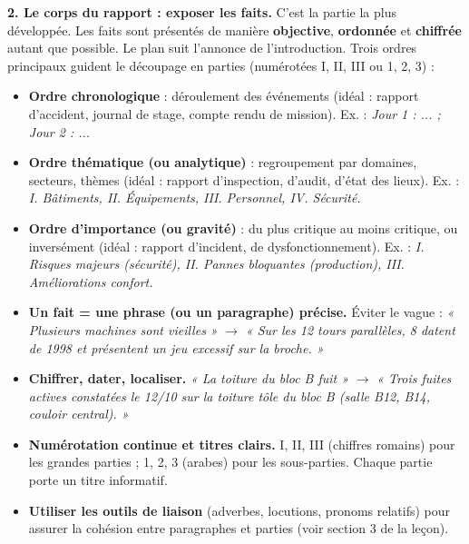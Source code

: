 \documentclass[11pt]{article}
\begin{document}
\textbf{2. Le corps du rapport : exposer les faits.} C'est la partie la plus développée. Les faits sont présentés de manière \textbf{objective}, \textbf{ordonnée} et \textbf{chiffrée} autant que possible. Le plan suit l'annonce de l'introduction. Trois ordres principaux guident le découpage en parties (numérotées I, II, III ou 1, 2, 3) :
\begin{itemize}
\item \textbf{Ordre chronologique} : déroulement des événements (idéal : rapport d'accident, journal de stage, compte rendu de mission). Ex. : \emph{Jour 1 : ... ; Jour 2 : ...}
\item \textbf{Ordre thématique (ou analytique)} : regroupement par domaines, secteurs, thèmes (idéal : rapport d'inspection, d'audit, d'état des lieux). Ex. : \emph{I. Bâtiments, II. Équipements, III. Personnel, IV. Sécurité.}
\item \textbf{Ordre d'importance (ou gravité)} : du plus critique au moins critique, ou inversément (idéal : rapport d'incident, de dysfonctionnement). Ex. : \emph{I. Risques majeurs (sécurité), II. Pannes bloquantes (production), III. Améliorations confort.}
\end{itemize}
\begin{attention}
\begin{itemize}
\item \textbf{Un fait = une phrase (ou un paragraphe) précise.} Éviter le vague : \emph{« Plusieurs machines sont vieilles »} $\rightarrow$ \emph{« Sur les 12 tours parallèles, 8 datent de 1998 et présentent un jeu excessif sur la broche. »}
\item \textbf{Chiffrer, dater, localiser.} \emph{« La toiture du bloc B fuit »} $\rightarrow$ \emph{« Trois fuites actives constatées le 12/10 sur la toiture tôle du bloc B (salle B12, B14, couloir central). »}
\item \textbf{Numérotation continue et titres clairs.} I, II, III (chiffres romains) pour les grandes parties ; 1, 2, 3 (arabes) pour les sous-parties. Chaque partie porte un titre informatif.
\item \textbf{Utiliser les outils de liaison} (adverbes, locutions, pronoms relatifs) pour assurer la cohésion entre paragraphes et parties (voir section 3 de la leçon).
\end{itemize}
\end{attention}
\end{document}
